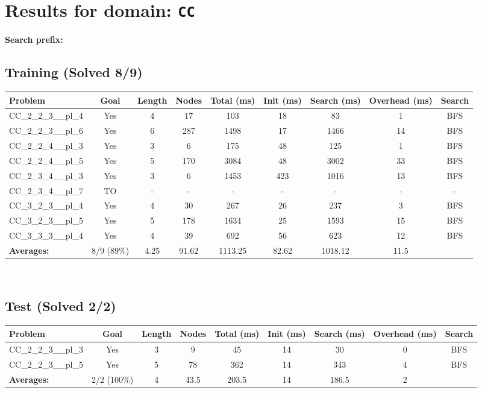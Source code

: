 \documentclass{article}
\begin{document}
\section*{Results for domain: \texttt{CC}}
\textbf{Search prefix:} 
\\[0.5cm]
\subsection*{Training (Solved 8/9)}
\begin{tabular}{lcccccccc}
\toprule
Problem & Goal & Length & Nodes & Total (ms) & Init (ms) & Search (ms) & Overhead (ms) & Search \\
\midrule
CC\_2\_2\_3\_\_pl\_4 & Yes & 4 & 17 & 103 & 18 & 83 & 1 & BFS \\
CC\_2\_2\_3\_\_pl\_6 & Yes & 6 & 287 & 1498 & 17 & 1466 & 14 & BFS \\
CC\_2\_2\_4\_\_pl\_3 & Yes & 3 & 6 & 175 & 48 & 125 & 1 & BFS \\
CC\_2\_2\_4\_\_pl\_5 & Yes & 5 & 170 & 3084 & 48 & 3002 & 33 & BFS \\
CC\_2\_3\_4\_\_pl\_3 & Yes & 3 & 6 & 1453 & 423 & 1016 & 13 & BFS \\
CC\_2\_3\_4\_\_pl\_7 & TO & - & - & - & - & - & - & - \\
CC\_3\_2\_3\_\_pl\_4 & Yes & 4 & 30 & 267 & 26 & 237 & 3 & BFS \\
CC\_3\_2\_3\_\_pl\_5 & Yes & 5 & 178 & 1634 & 25 & 1593 & 15 & BFS \\
CC\_3\_3\_3\_\_pl\_4 & Yes & 4 & 39 & 692 & 56 & 623 & 12 & BFS \\
\textbf{Averages:} & 8/9 (89\%) & 4.25 & 91.62 & 1113.25 & 82.62 & 1018.12 & 11.5 & \\
\bottomrule
\end{tabular}
\\[0.7cm]
\subsection*{Test (Solved 2/2)}
\begin{tabular}{lcccccccc}
\toprule
Problem & Goal & Length & Nodes & Total (ms) & Init (ms) & Search (ms) & Overhead (ms) & Search \\
\midrule
CC\_2\_2\_3\_\_pl\_3 & Yes & 3 & 9 & 45 & 14 & 30 & 0 & BFS \\
CC\_2\_2\_3\_\_pl\_5 & Yes & 5 & 78 & 362 & 14 & 343 & 4 & BFS \\
\textbf{Averages:} & 2/2 (100\%) & 4 & 43.5 & 203.5 & 14 & 186.5 & 2 & \\
\bottomrule
\end{tabular}
\\[0.7cm]
\end{document}
